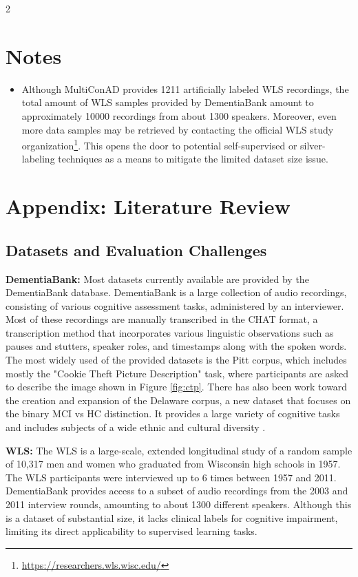 \documentclass[10pt]{article}
\newcommand{\tpar}[1]{\par\textbf{#1: }}
\begin{document}
\begin{multicols}{2}
\section{Notes}
\begin{itemize}
	\item Although MultiConAD provides 1211 artificially labeled WLS
		recordings, the total amount of WLS samples provided by DementiaBank
		amount to approximately 10000 recordings from about 1300 speakers.
		Moreover, even more data samples may be retrieved by contacting the
		official WLS study
		organization\footnote{\href{https://researchers.wls.wisc.edu/}{https://researchers.wls.wisc.edu/}}.
		This opens the door to potential self-supervised or silver-labeling
		techniques as a means to mitigate the limited dataset size issue.
\end{itemize}


\section*{Appendix: Literature Review} 
\subsection{Datasets and Evaluation Challenges} \label{sec:lit-review-datasets}
\tpar{DementiaBank} Most datasets currently available are provided by the
DementiaBank database. DementiaBank is a large collection of audio recordings,
consisting of various cognitive assessment tasks, administered by an
interviewer. Most of these recordings are manually transcribed in the CHAT
format, a transcription method that incorporates various linguistic
observations such as pauses and stutters, speaker roles, and timestamps along
with the spoken words. The most widely used of the provided datasets is the
Pitt corpus, which includes mostly the "Cookie Theft Picture Description" task,
where participants are asked to describe the image shown in Figure
\ref{fig:ctp}. There has also been work toward the creation and expansion of
the Delaware corpus, a new dataset that focuses on the binary MCI vs HC
distinction. It provides a large variety of cognitive tasks and includes
subjects of a wide ethnic and cultural diversity
\cite{lanziDementiaBankTheoreticalRationale2023}.

\tpar{WLS} The WLS is a large-scale, extended longitudinal study of a random
sample of 10,317 men and women who graduated from Wisconsin high schools in
1957. The WLS participants were interviewed up to 6 times between 1957 and
2011. DementiaBank provides access to a subset of audio recordings from the
2003 and 2011 interview rounds, amounting to about 1300 different speakers.
Although this is a dataset of substantial size, it lacks clinical labels for
cognitive impairment, limiting its direct applicability to supervised learning
tasks.


\end{multicols}
\end{document}
